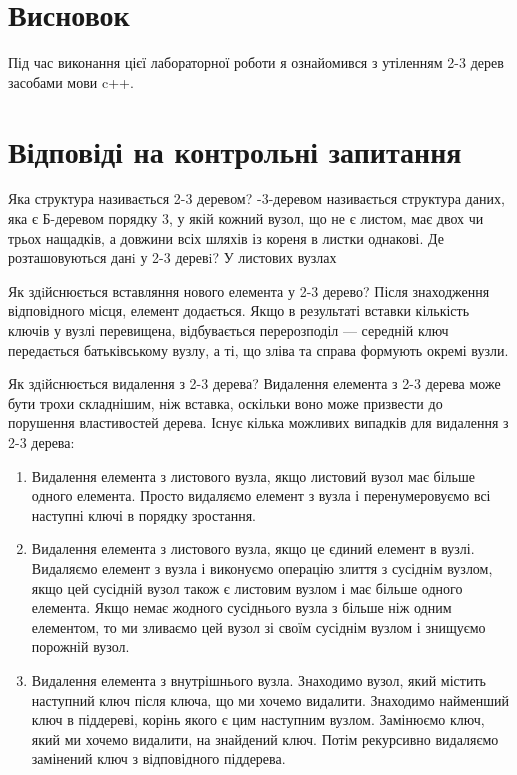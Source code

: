 \documentclass[a4paper, 12pt, oneside]{extarticle}
\begin{document}
\section*{Висновок}

Під час виконання цієї лабораторної роботи я ознайомився з
утіленням 2-3 дерев засобами мови c++.

\section*{Відповіді на контрольні запитання}
\begin{itemize}
	\question Яка структура називається 2-3 деревом?
	-3-деревом називається структура даних, яка є Б-деревом порядку 3, у
якій кожний вузол, що не є листом, має двох чи трьох нащадків, а довжини
всіх шляхів із кореня в листки однакові.
	\question Де розташовуються данi у 2-3 деревi?
	\answer У листових вузлах

	\question Як здiйснюється вставляння нового елемента у 2-3 дерево?
	\answer Після знаходження відповідного місця, елемент додається. Якщо в результаті вставки кількість ключів у вузлі перевищена, відбувається перерозподіл --- середній ключ передається батьківському вузлу, а ті, що зліва та справа формують окремі вузли.

	\question Як здiйснюється видалення з 2-3 дерева?
	\answer Видалення елемента з 2-3 дерева може бути трохи складнішим, ніж вставка, оскільки воно може призвести до порушення властивостей дерева. Існує кілька можливих випадків для видалення з 2-3 дерева:
		\begin{enumerate}
			\item Видалення елемента з листового вузла, якщо листовий вузол має більше одного елемента. Просто видаляємо елемент з вузла і перенумеровуємо всі наступні ключі в порядку зростання.

			\item Видалення елемента з листового вузла, якщо це єдиний елемент в вузлі. Видаляємо елемент з вузла і виконуємо операцію злиття з сусіднім вузлом, якщо цей сусідній вузол також є листовим вузлом і має більше одного елемента. Якщо немає жодного сусіднього вузла з більше ніж одним елементом, то ми зливаємо цей вузол зі своїм сусіднім вузлом і знищуємо порожній вузол.

			\item Видалення елемента з внутрішнього вузла. Знаходимо вузол, який містить наступний ключ після ключа, що ми хочемо видалити. Знаходимо найменший ключ в піддереві, корінь якого є цим наступним вузлом. Замінюємо ключ, який ми хочемо видалити, на знайдений ключ. Потім рекурсивно видаляємо замінений ключ з відповідного піддерева.


\end{enumerate}
\end{itemize}
\end{document}
